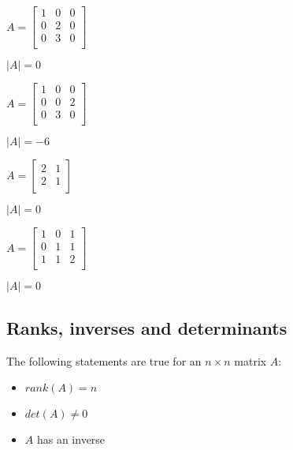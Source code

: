 \documentclass[12pt,a4paper]{article}
\theoremstyle{regla}
\theoremstyle{remark}
\theoremstyle{definition}
\theoremstyle{nonumberbreak}
\begin{document}
\begin{xmpl}


$A=
\begin{bmatrix}
1 & 0 & 0  \\
0 & 2 & 0  \\
0 & 3 & 0  \\
\end{bmatrix}$

$\vert A \vert = 0$


\end{xmpl}
\begin{xmpl}

$A=
\begin{bmatrix}
1 & 0 & 0  \\
0 & 0 & 2  \\
0 & 3 & 0  \\
\end{bmatrix}$

$\vert A \vert = -6$
\end{xmpl}
\begin{xmpl}


$A=
\begin{bmatrix}
2 & 1  \\
2 & 1  \\
\end{bmatrix}$

$\vert A \vert = 0$
\end{xmpl}
\begin{xmpl}


$A=
\begin{bmatrix}
1 & 0 & 1  \\
0 & 1 & 1  \\
1 & 1 & 2  \\
\end{bmatrix}$

$\vert A \vert = 0$
\end{xmpl}

\subsection{Ranks, inverses and determinants}
\begin{fbox}
\begin{minipage}{0.97\textwidth}
The following statements are true for an $n\times n$ matrix $A$:\\
\begin{itemize}
\item $rank (A)= n$
\item $det(A)\neq 0$
\item $A$ has an inverse
\end{itemize}
\end{minipage}
\end{fbox}
\end{document}
